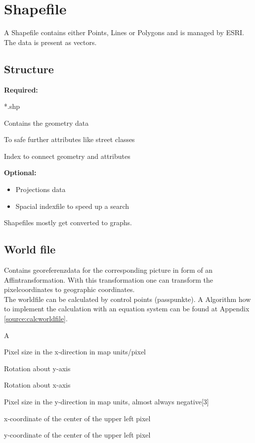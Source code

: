 \chapter{Shapefile}
\label{ch:shapefile}

A Shapefile contains either Points, Lines or Polygons and is managed by ESRI. The data is present as vectors.

\section{Structure}
\label{ch:shapefile:sec:structure}

\textbf{Required:}
\begin{labeling}[:]{*.shp}
    \item[*.shp]Contains the geometry data
    \item[*.dbf]To safe further attributes like street classes
    \item[*.shx]Index to connect geometry and attributes
\end{labeling}

\textbf{Optional:}
\begin{itemize}
    \item Projections data
    \item Spacial indexfile to speed up a search
\end{itemize}

Shapefiles mostly get converted to graphs.

\newpage

\section{World file}
Contains georeferenzdata for the corresponding picture in form of an Affintransformation.
With this transformation one can transform the pixelcoordinates to geographic coordinates. \\
The worldfile can be calculated by control points (passpunkte). A Algorithm how to implement
the calculation with an equation system can be found at Appendix \ref{source:calcworldfile}.

\begin{labeling}[:]{A}
    \item[A]Pixel size in the x-direction in map units/pixel
    \item[D]Rotation about y-axis
    \item[B]Rotation about x-axis
    \item[E]Pixel size in the y-direction in map units, almost always negative[3]
    \item[C]x-coordinate of the center of the upper left pixel
    \item[F]y-coordinate of the center of the upper left pixel
\end{labeling}


